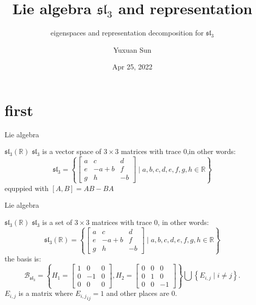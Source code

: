 \documentclass{beamer}
\title{Lie algebra $\mathfrak{sl}_3$ and representation}
\subtitle{eigenspaces and representation decomposition for $\mathfrak{sl}_3$}
\date{Apr 25, 2022}
\author{Yuxuan Sun}
\institute{Haverford College}
\newcommand{\R}{\mathbb{R}}
\newcounter{mytheorem}[section] \def\themytheorem{\thesection.\arabic{mytheorem}}
\begin{document}
	
\begin{frame}
\titlepage
\end{frame}

\section{first}




\begin{frame}{Lie algebra}

\begin{exm}{$\mathfrak{sl}_3(\R)$}{}
	$\mathfrak{sl}_{3}$ is a vector space of $3 \times 3$ matrices with trace 0,in other words:  \[
		\mathfrak{sl}_{3} = \left\{ \begin{bmatrix} a & c & d \\
		e & -a+b & f \\ g & h & -b\end{bmatrix} \mid a,b,c,d,e,f,g,h \in \R \right\} 
			\] equppied with $[A,B] = AB - BA$
\end{exm}

\end{frame}


\addtocounter{mytheorem}{-1}
\begin{frame}{Lie algebra}

\begin{exm}{$\mathfrak{sl}_3(\R)$}{}
	$\mathfrak{sl}_{3}$ is a set of $3 \times 3$ matrices with trace 0, in other words:  \[
		\mathfrak{sl}_{3}(\R) = \left\{ \begin{bmatrix} a & c & d \\
		e & -a+b & f \\ g & h & -b\end{bmatrix} \mid a,b,c,d,e,f,g,h \in \R \right\} 
	\] 
\tcblower
the basis is: \[
	\mathcal{B}_{\mathfrak{sl}_{3}} = \left\{ H_1 = \begin{bmatrix} 1 & 0 &0 \\ 0 & -1 & 0 \\ 0 &0 &0 \end{bmatrix}, H_2 = \begin{bmatrix} 0 &0 &0 \\ 0 &1&0 \\ 0&0&-1 \end{bmatrix}   \right\} \bigcup \left\{ E_{i,j} \mid i \neq j\right\}. 
\] $E_{i,j}$ is a matrix where ${E_{i,j}}_{ij} = 1$ and other places are $0$.
\end{exm}

\end{frame}
\end{document}
